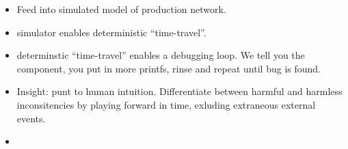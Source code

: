 \begin{itemize}
\begin{itemize}
    \item Feed into simulated model of production network. 
    \item simulator enables deterministic ``time-travel''.
    \item determinstic ``time-travel'' enables a debugging loop. We tell you
    the component, you put in more printfs, rinse and repeat until bug is found.
    \item Insight: punt to human intuition. Differentiate between harmful and
    harmless inconsitencies by playing forward in time, exluding extraneous
    external events.
    \item {}
    \end{itemize}
\end{itemize}

